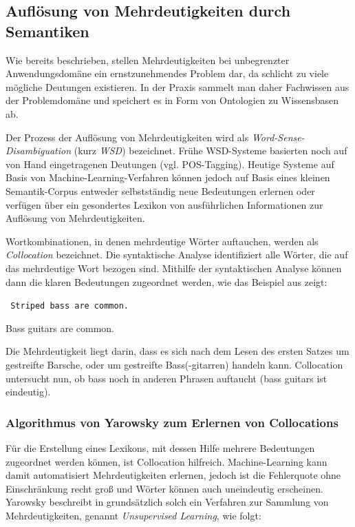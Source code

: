 \documentclass[12pt]{report}
\begin{document}
\subsection{Auflösung von Mehrdeutigkeiten durch \\Semantiken}
Wie bereits beschrieben, stellen Mehrdeutigkeiten bei unbegrenzter Anwendungsdomäne ein ernstzunehmendes Problem dar, da schlicht zu viele mögliche Deutungen existieren. In der Praxis sammelt man daher Fachwissen aus der Problemdomäne und speichert es in Form von Ontologien zu Wissensbasen ab.

Der Prozess der Auflösung von Mehrdeutigkeiten wird als \textit{Word-Sense-Disambiguation} (kurz \textit{WSD}) bezeichnet. Frühe WSD-Systeme basierten noch auf von Hand eingetragenen Deutungen (vgl. POS-Tagging). Heutige Systeme auf Basis von Machine-Learning-Verfahren können jedoch auf Basis eines kleinen Semantik-Corpus entweder selbstständig neue Bedeutungen erlernen oder verfügen über ein gesondertes Lexikon von ausführlichen Informationen zur Auflösung von Mehrdeutigkeiten. 

Wortkombinationen, in denen mehrdeutige Wörter auftauchen, werden als \textit{Collocation} bezeichnet. Die syntaktische Analyse identifiziert alle Wörter, die auf das mehrdeutige Wort bezogen sind. Mithilfe der syntaktischen Analyse können dann die klaren Bedeutungen zugeordnet werden, wie das Beispiel aus \cite{cop04} zeigt:

\tt
Striped bass are common.

Bass guitars are common.
\rm

Die Mehrdeutigkeit liegt darin, dass es sich nach dem Lesen des ersten Satzes um gestreifte Barsche, oder um gestreifte Bass(-gitarren) handeln kann. Collocation untersucht nun, ob bass noch in anderen Phrasen auftaucht (bass guitars ist eindeutig).

\subsubsection{Algorithmus von Yarowsky zum Erlernen von Collocations}
Für die Erstellung eines Lexikons, mit dessen Hilfe mehrere Bedeutungen zugeordnet werden können, ist Collocation hilfreich. Machine-Learning kann damit automatisiert Mehrdeutigkeiten erlernen, jedoch ist die Fehlerquote ohne Einschränkung recht groß und Wörter können auch uneindeutig erscheinen. Yarowsky beschreibt in \cite{yar95} grundsätzlich solch ein Verfahren zur Sammlung von Mehrdeutigkeiten, genannt \textit{Unsupervised Learning}, wie folgt: 
\end{document}
